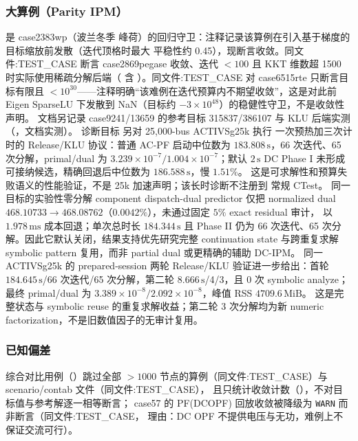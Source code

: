 \subsubsection*{大算例（Parity IPM）}
 是 case2383wp（波兰冬季
峰荷）的回归守卫：注释记录该算例在引入基于梯度的目标缩放前发散（迭代顶格时最大
平稳性约 0.45），现断言收敛。同文件:TEST\_CASE 断言 case2869pegase 收敛、迭代
$<100$ 且 KKT 维数超 1500 时实际使用稀疏分解后端（
含 ）。同文件:TEST\_CASE 对 case6515rte 只断言目标有限且
$<10^{30}$——注释明确“该难例在迭代预算内不期望收敛”，这是对此前 Eigen SparseLU
下发散到 NaN（目标约 $-3\times10^{48}$）的稳健性守卫，不是收敛性声明。
文档另记录 case9241/13659 的参考目标 315837/386107 与 KLU 后端实测
（，文档实测）。
诊断目标  另对 25,000-bus ACTIVSg25k 执行
一次预热加三次计时的 Release/KLU 协议：普通 AC-PF 启动中位数为
$183.808\,\mathrm{s}$，66 次迭代、65 次分解，primal/dual 为
$3.239\times10^{-7}/1.004\times10^{-7}$；默认 $2\,\mathrm{s}$ DC Phase I
未形成可接纳候选，精确回退后中位数为 $186.588\,\mathrm{s}$，慢 $1.51\%$。
这是可求解性和预算失败语义的性能验证，不是 25k 加速声明；该长时诊断不注册到
常规 CTest。
同一目标的实验性零分解 component dispatch-dual predictor 仅把 normalized dual
$468.10733\to468.08762$（$0.0042\%$），未通过固定 $5\%$ exact residual 审计，
以 $1.978\,\mathrm{ms}$ 成本回退；单次总时长 $184.344\,\mathrm{s}$ 且 Phase II
仍为 66 次迭代、65 次分解。因此它默认关闭，结果支持优先研究完整 continuation
state 与跨重复求解 symbolic pattern 复用，而非 partial dual 或更精确的辅助 DC-IPM。
同一 ACTIVSg25k 的 prepared-session 两轮 Release/KLU 验证进一步给出：首轮
$184.645\,\mathrm{s}$/66 次迭代/65 次分解，第二轮
$8.666\,\mathrm{s}$/4/3，且 0 次 symbolic analyze；最终 primal/dual 为
$3.389\times10^{-8}/2.092\times10^{-8}$，峰值 RSS $4709.6\,\mathrm{MiB}$。
这是完整状态与 symbolic reuse 的重复求解收益；第二轮 3 次分解均为新 numeric
factorization，不是旧数值因子的无审计复用。

\subsubsection*{已知偏差}
综合对比用例（）跳过全部
$>1000$ 节点的算例（同文件:TEST\_CASE）与 scenario/contab 文件（同文件:TEST\_CASE），
且只统计收敛计数（），不对目标值与参考解逐一相等断言；
case57 的 PF(DCOPF) 回放收敛被降级为 \texttt{WARN} 而非断言（同文件:TEST\_CASE，
理由：DC OPF 不提供电压与无功，难例上不保证交流可行）。

